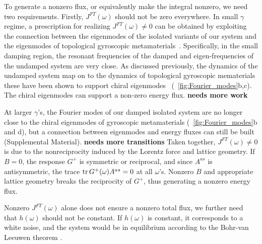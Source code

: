 \documentclass[
 preprint,
 preprintnumbers,
 amsmath,amssymb,
 aps,
 pre,
 longbibliography,
 superscriptaddress,
 10pt, twocolumn
]{revtex4-1}
\begin{document}
To generate a nonzero flux, or equivalently make the integral nonzero, we need two requirements.
Firstly, $J^{FT}(\omega)$ should not be zero everywhere.
In small $\gamma$ regime, a prescription for realizing $J^{FT}(\omega) \neq 0$ can be obtained by exploiting the connection between the eigenmodes of the isolated variants of our system and the eigenmodes of topological gyroscopic metamaterials~\cite{Nash2015TopologicalMechanics}. Specifically, in the small damping region, the resonant frequencies of the damped and eigen-frequencies of the undamped system are very close. As discussed previously, the dynamics of the undamped system map on to the dynamics of topological gyroscopic mematerials \textendash these have been shown to support chiral eigenmodes~\cite{Nash2015TopologicalMechanics} (\figurename~\ref{fig:Fourier_modes}b,c). The chiral eigenmodes can support a non-zero energy flux. {\bf needs more work}

At larger $\gamma$'s, the Fourier modes of our damped isolated system are no longer close to the chiral eigenmodes of gyroscopic metamaterials (\figurename~\ref{fig:Fourier_modes}b and d), but a connection between eigenmodes and energy fluxes can still be built (Supplemental Material).
{\bf needs more transitions}
Taken together, $J^{FT}(\omega) \neq 0$ is due to the nonreciprocity induced by the Lorentz force and lattice geometry. If $B=0$, the response $G^+$ is symmetric or reciprocal, and since $A^{as}$ is antisymmetric, the trace $\tr G^+(\omega) A^{as}=0$ at all $\omega$'s. Nonzero $B$ and appropriate lattice geometry breaks the reciprocity of $G^+$, thus generating a nonzero energy flux.

Nonzero $J^{FT}(\omega)$ alone does not ensure a nonzero total flux, we further need that $h(\omega)$ should not be constant.
If $h(\omega)$ is constant, it corresponds to a white noise, and the system would be in equilibrium according to the Bohr-van Leeuwen theorem \cite{Pradhan2010NonexistenceClassical}. %
\end{document}
